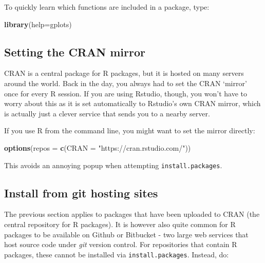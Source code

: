 \documentclass[]{book}
\newenvironment{Shaded}{\begin{snugshade}}{\end{snugshade}}
\newcommand{\DataTypeTok}[1]{\textcolor[rgb]{0.13,0.29,0.53}{#1}}
\newcommand{\KeywordTok}[1]{\textcolor[rgb]{0.13,0.29,0.53}{\textbf{#1}}}
\newcommand{\NormalTok}[1]{#1}
\newcommand{\StringTok}[1]{\textcolor[rgb]{0.31,0.60,0.02}{#1}}
\begin{document}
To quickly learn which functions are included in a package, type:

\begin{Shaded}
\begin{Highlighting}[]
\KeywordTok{library}\NormalTok{(}\DataTypeTok{help=}\NormalTok{gplots)}
\end{Highlighting}
\end{Shaded}

\hypertarget{setting-the-cran-mirror}{%
\subsection{Setting the CRAN mirror}\label{setting-the-cran-mirror}}

CRAN is a central package for R packages, but it is hosted on many servers around the world. Back in the day, you always had to set the CRAN `mirror' once for every R session. If you are using Rstudio, though, you won't have to worry about this as it is set automatically to Rstudio's own CRAN mirror, which is actually just a clever service that sends you to a nearby server.

If you use R from the command line, you might want to set the mirror directly:

\begin{Shaded}
\begin{Highlighting}[]
\KeywordTok{options}\NormalTok{(}\DataTypeTok{repos =} \KeywordTok{c}\NormalTok{(}\DataTypeTok{CRAN =} \StringTok{"https://cran.rstudio.com/"}\NormalTok{))}
\end{Highlighting}
\end{Shaded}

This avoids an annoying popup when attempting \texttt{install.packages}.

\hypertarget{install-from-git-hosting-sites}{%
\subsection{Install from git hosting sites}\label{install-from-git-hosting-sites}}

The previous section applies to packages that have been uploaded to CRAN (the central repository for R packages). It is however also quite common for R packages to be available on Github or Bitbucket - two large web services that host source code under \emph{git} version control. For repositories that contain R packages, these cannot be installed via \texttt{install.packages}. Instead, do:
\end{document}
